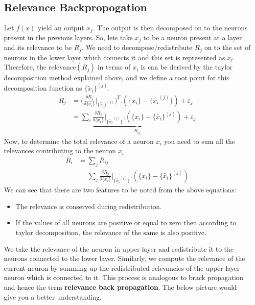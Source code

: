 \documentclass{article}
\begin{document}
	\subsection{Relevance Backpropogation}
	Let $f(x)$ yield an output $x_f$. The output is then decomposed on to the neurons present in the previous layers. So, lets take $x_j$ to be a neuron present at a layer and its relevance to be $R_j$. We need to decompose/redistribute $R_j$ on to the set of neurons in the lower layer which connects it and this set is represented as ${x_i}$. Therefore, the relevance$(R_j)$ in terms of $x_i$ is can be derived by the taylor decomposition method explained above, and we define a root point for this decomposition function as $\{\tilde{x}_i\}^{(j)}$. 
	\begin{align}
		R_j &= \Bigg( 
				\frac{\delta R_j}{\delta \{x_i\}}
				\rvert_{\{\tilde{x_i}\}^{(j)}}
			\Bigg)^T
			. (\{x_i\} - \{ \tilde{x_i}^{(j)}\}) + \varepsilon_j \nonumber \\
		  &= \sum_{i} 
			  \underbrace{\frac{\delta R_j}{\delta \{x_i\}}
			  \rvert_{\{\tilde{x_i}^{(j)}\}}
			  . (\{x_i\} - \{ \tilde{x_i}\}^{(j)})}_{R_{ij}} + \varepsilon_j
	\end{align}
	Now, to determine the total relevance of a neuron $x_i$ you need to sum all the relevances contributing to the neuron $x_i$. 
	\begin{align}
		R_i &= \sum_{j} R_{ij} \nonumber \\
		&= \sum_{j} 
		\frac{\delta R_j}{\delta \{x_i\}}
		\rvert_{\{\tilde{x_i}^{(j)}\}}
		. (\{x_i\} - \{ \tilde{x_i}\}^{(j)})
	\end{align}
	We can see that there are two features to be noted from the above equations:
	\begin{itemize}
		\item The relevance is conserved during redistribution.
		\item If the values of all neurons  are positive or equal to zero then according to taylor decomposition, the relevance of the same is also positive.
	\end{itemize}
	
	  We take the relevance of the neuron in upper layer and redistribute it to the neurons connected to the lower layer. Similarly, we compute the relevance of the current neuron by summing up the redistributed relevancies of the upper layer neuron which is connected to it. This process is analogous to brack propagation and hence the term \textbf{relevance back propagation}. The below picture would give you a better understanding.
	  
\end{document}
